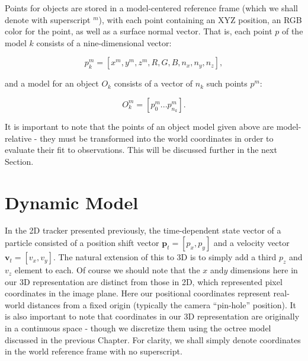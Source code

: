 
Points for objects are stored in a model-centered reference frame (which we shall denote with superscript $^m$), with each point containing an XYZ position, an RGB color for the point, as well as a surface normal vector. That is, each point $p$ of the model $k$ consists of a nine-dimensional vector: 

\begin{equation} \label{eqn:point}
p^m_k = [x^m,y^m,z^m,R,G,B,n_x,n_y,n_z],
\end{equation}
 
 and a model for an object $O_k$ consists of a vector of $n_k$ such points $p^m$:
 
 \begin{equation} \label{eqn:model}
 O^m_k = [p^m_0 ... p^m_{n_k}].
\end{equation}

It is important to note that the points of an object model given above are model-relative - they must be transformed into the world coordinates in order to evaluate their fit to observations. This will be discussed further in the next Section.

\section{Dynamic Model}
\label{sec:Dynamic_model}
In the 2D tracker presented previously, the time-dependent state vector of a particle consisted of a position shift vector $\mathbf{p}_t=[p_x,p_y]$ and a velocity vector $\mathbf{v}_t=[v_x,v_y]$. The natural extension of this to 3D is to simply add a third $p_z$ and $v_z$ element to each. Of course we should note that the $x$ and$y$ dimensions here in our 3D representation are distinct from those in 2D, which represented pixel coordinates in the image plane. Here our positional coordinates represent real-world distances from a fixed origin (typically the camera ``pin-hole'' position). It is also important to note that coordinates in our 3D representation are originally in a continuous space - though we discretize them using the octree model discussed in the previous Chapter. For clarity, we shall simply denote coordinates in the world reference frame with no superscript.

